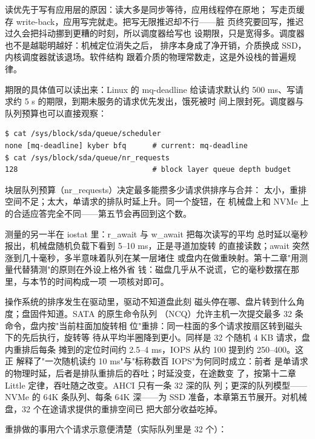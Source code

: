 读优先于写有应用层的原因：读大多是同步等待，应用线程停在原地；
写走页缓存 write-back，应用写完就走。把写无限推迟却不行——脏
页终究要回写，推迟过久会把抖动挪到更糟的时刻，所以调度器给写也
设期限，只是宽得多。调度器也不是越聪明越好：机械定位消失之后，
排序本身成了净开销，介质换成 SSD，内核调度器就该退场。软件结构
跟着介质的物理常数走，这是外设栈的普遍规律。

期限的具体值可以读出来：Linux 的 mq-deadline 给读请求默认约
500 ms、写请求约 5 s 的期限，到期未服务的请求优先发出，饿死被时
间上限封死。调度器与队列预算也可以直接观察：

\begin{lstlisting}
$ cat /sys/block/sda/queue/scheduler
none [mq-deadline] kyber bfq      # current: mq-deadline
$ cat /sys/block/sda/queue/nr_requests
128                               # block layer queue depth budget
\end{lstlisting}

块层队列预算（nr\_requests）决定最多能攒多少请求供排序与合并：
太小，重排空间不足；太大，单请求的排队时延上升。同一个旋钮，在
机械盘上和 NVMe 上的合适应答完全不同——第五节会再回到这个数。

测量的另一半在 iostat 里：r\_await 与 w\_await 把每次读写的平均
总时延以毫秒报出，机械盘随机负载下看到 5--10 ms，正是寻道加旋转
的直接读数；await 突然涨到几十毫秒，多半意味着队列在某一层堵住
或盘内在做重映射。第十二章"用测量代替猜测"的原则在外设上格外省
钱：磁盘几乎从不说谎，它的毫秒数摆在那里，与本节的时间构成一项
一项核对即可。

操作系统的排序发生在驱动里，驱动不知道盘此刻
磁头停在哪、盘片转到什么角度；盘固件知道。SATA 的原生命令队列
（NCQ）允许主机一次提交最多 32 条命令，盘内按"当前柱面加旋转相
位"重排：同一柱面的多个请求按扇区转到磁头下的先后执行，旋转等
待从平均半圈降到更小。同样是 32 个随机 4 KB 请求，盘内重排后每条
摊到的定位时间约 2.5--4 ms，IOPS 从约 100 提到约 250--400。这正
解释了"一次随机读约 10 ms"与"标称数百 IOPS"为何同时成立：前者
是单请求的物理时延，后者是排队重排后的吞吐；时延没变，在途数变
了，按第十二章 Little 定律，吞吐随之改变。AHCI 只有一条 32 深的队
列；更深的队列模型——NVMe 的 64K 条队列、每条 64K 深——为 SSD
准备，本章第五节展开。对机械盘，32 个在途请求提供的重排空间已
把大部分收益吃掉。

重排做的事用六个请求示意便清楚（实际队列里是 32 个）：

